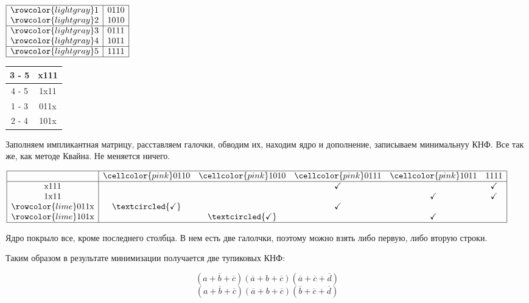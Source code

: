 \documentclass[a4paper,12pt]{article}
\begin{document}
\begin{table}[h!]
\centering
$\begin{array}[t]{| c | c |} \hline
\rowcolor{lightgray}1 & 0110 \\
\rowcolor{lightgray}2 & 1010 \\ \hline
\rowcolor{lightgray}3 & 0111 \\
\rowcolor{lightgray}4 & 1011 \\ \hline
\rowcolor{lightgray}5 & 1111 \\ \hline
\end{array}$
\quad
\begin{tabular}[t]{| c | c |} \hline
3 - 5 & x111 \\ \hline
4 - 5 & 1x11 \\ \hline
1 - 3 & 011x \\
2 - 4 & 101x \\ \hline
\end{tabular}
\end{table}

Заполняем импликантная матрицу, расставляем галочки, обводим их, находим ядро и дополнение, записываем минимальнуу КНФ.
Все так же, как методе Квайна.
Не меняется ничего.

\begin{table}[h!]
\centering
	$\begin{array}{| c | *{5}{c} |}
	\hline
	& \cellcolor{pink}0110 & \cellcolor{pink}1010 & \cellcolor{pink}0111 & \cellcolor{pink}1011 & 1111 \\ \hline
	\text{x}111 & & & \checkmark & & \checkmark \\
	1\text{x}11 & & & & \checkmark & \checkmark \\
	\rowcolor{lime}011\text{x} & \textcircled{\checkmark} & & \checkmark & & \\
	\rowcolor{lime}101\text{x} & & \textcircled{\checkmark} & & \checkmark & \\ \hline
	\end{array}$
\end{table}

Ядро покрыло все, кроме последнего столбца.
В нем есть две галолчки, поэтому можно взять либо первую, либо вторую строки.

Таким образом в результате минимизации получается две тупиковых КНФ:

\[(a + \overline{b} + \overline{c})(\overline{a} + b + \overline{c})(\overline{a} + \overline{c} + \overline{d})\]
\[(a + \overline{b} + \overline{c})(\overline{a} + b + \overline{c})(\overline{b} + \overline{c} + \overline{d})\]
\end{document}
